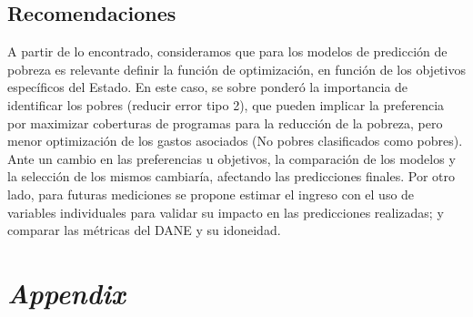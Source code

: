 \documentclass[11pt]{article}
\begin{document}
\subsection{Recomendaciones}
  \justify
A partir de lo encontrado, consideramos que para los modelos de predicción de pobreza es relevante definir la función de optimización, en función de los objetivos específicos del Estado. En este caso, se sobre ponderó la importancia de identificar los pobres (reducir error tipo 2), que pueden implicar la preferencia por maximizar coberturas de programas para la reducción de la pobreza, pero menor optimización de los gastos asociados (No pobres clasificados como pobres). Ante un cambio en las preferencias u objetivos, la comparación de los modelos y la selección de los mismos cambiaría, afectando las predicciones finales.
\justify
Por otro lado, para futuras mediciones se propone estimar el ingreso con el uso de variables individuales para validar su impacto en las predicciones realizadas; y comparar las métricas del DANE y su idoneidad. 



\pagebreak
\singlespacing


\pagebreak





\pagebreak
\appendix
\renewcommand{\theequation}{\Alph{chapter}.\arabic{equation}}

\setcounter{figure}{0}
\setcounter{table}{0}
\makeatletter 
\renewcommand{\thefigure}{A.\@arabic\c@figure}
\renewcommand{\thetable}{A.\@arabic\c@table}

\section{\bf\emph {Appendix}}\label{sec:appendix_tables} 
\end{document}
